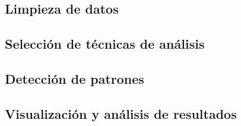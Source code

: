 \subsection{Limpieza de datos}

\subsection{Selección de técnicas de análisis}

\subsection{Detección de patrones}

\subsection{Visualización y análisis de resultados}


